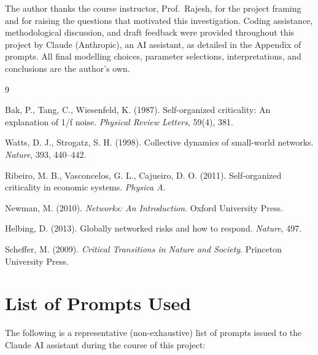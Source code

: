 \documentclass[11pt,a4paper]{article}
\begin{document}
The author thanks the course instructor, Prof.\ Rajesh, for the project
framing and for raising the questions that motivated this investigation.
Coding assistance, methodological discussion, and draft feedback were
provided throughout this project by Claude (Anthropic), an AI assistant,
as detailed in the Appendix of prompts. All final modelling choices,
parameter selections, interpretations, and conclusions are the author's
own.
\newpage
\begin{thebibliography}{9}

Bak, P., Tang, C., Wiesenfeld, K. (1987).
Self-organized criticality: An explanation of 1/f noise.
\textit{Physical Review Letters}, 59(4), 381.

Watts, D. J., Strogatz, S. H. (1998).
Collective dynamics of small-world networks.
\textit{Nature}, 393, 440–442.

Ribeiro, M. B., Vasconcelos, G. L., Cajueiro, D. O. (2011).
Self-organized criticality in economic systems.
\textit{Physica A}.

Newman, M. (2010).
\textit{Networks: An Introduction}.
Oxford University Press.

Helbing, D. (2013).
Globally networked risks and how to respond.
\textit{Nature}, 497.

Scheffer, M. (2009).
\textit{Critical Transitions in Nature and Society}.
Princeton University Press.

\end{thebibliography}

\appendix

\section{List of Prompts Used}

The following is a representative (non-exhaustive) list of prompts issued
to the Claude AI assistant during the course of this project:
\end{document}

